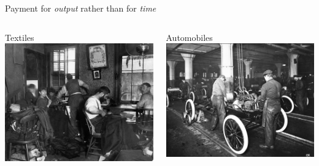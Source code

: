 \documentclass[presentation]{subfiles}
\begin{document}
\begin{frame}[t]{Payment for \emph{output} rather than for \emph{time}}
  \begin{columns}[T]
    \begin{column}{0.33\textwidth}
      \centering
      Textiles\\
      \includegraphics[max width=\linewidth,max height=.3\textheight,keepaspectratio]{../../../presentations/common_figures/pieceworkers.jpg}
    \end{column}
    \begin{column}{0.33\textwidth}
      \centering
      Automobiles\\
      \includegraphics[max width=\linewidth,max height=.3\textheight,keepaspectratio]{../../../presentations/common_figures/photo/ford_assembly_line.jpg}

\end{column}
\end{columns}
\end{frame}
\end{document}
